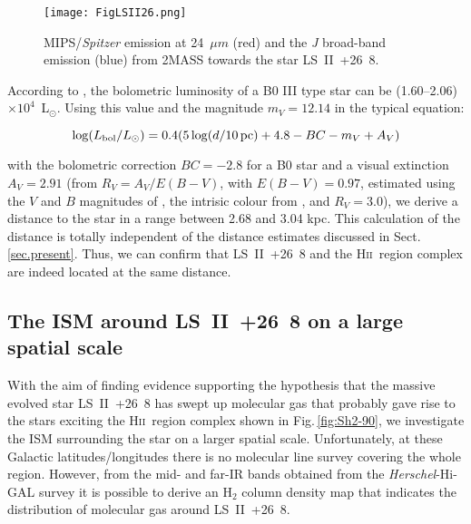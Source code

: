 \documentclass[fleqn,usenatbib]{mnras}
\def\hii{H\textsc{ii}}
\begin{document}
\begin{figure}
    \centering
	\texttt{[image: FigLSII26.png]}
    \caption{MIPS/{\it Spitzer} emission at 24~$\mu m$ (red) and the {\it J} 
broad-band emission (blue) from 2MASS towards the star LS~II~+26~8.}
    \label{fig:LSII26}
\end{figure}

According to \citet{hohle10}, the bolometric luminosity of a B0 III type star can be (1.60--2.06) $\times 10^{4}$~L$_{\odot}$. 
Using this value and the magnitude $m_{V} = 12.14$ \citep{zaca12} in the typical equation:

\begin{equation}
\log(L_{\rm bol}/L_\odot)=0.4(5\log(d/10\,{\rm pc})+4.8 - BC - m_{V} + A_{V}) 
\label{eq.lum}
\end{equation}

\noindent with the bolometric correction $BC = -2.8$ for a B0 star and a visual 
extinction  $A_{V} = 2.91$ (from $R_{V}=A_{V}/E(B-V)$, with $E(B-V)=0.97$,  
estimated using the $V$ and $B$ magnitudes of \citealt{zaca12}, the intrisic colour 
from \citealt{Wegner94}, and $R_{V}=3.0$), we derive a distance to the star in a range 
between 2.68 and 3.04 kpc.  
This calculation of the distance is totally independent of the distance estimates discussed in Sect.\,\ref{sec.present}.
Thus, we can confirm that LS~II~+26~8 and the \hii~region complex are indeed located at the same distance.


\subsection{The ISM around LS~II~+26~8 on a large spatial scale}

With the aim of finding evidence supporting the hypothesis that the massive evolved star
 LS~II~+26~8 has swept up molecular gas that probably gave rise to the stars exciting the
 \hii~region complex shown in Fig.\,\ref{fig:Sh2-90}, we investigate the ISM 
surrounding the star on a larger spatial scale. Unfortunately, at these Galactic 
latitudes/longitudes there is no molecular line survey covering the whole region. 
However, from the mid- and far-IR bands obtained from the {\it Herschel}-Hi-GAL survey
\citep{molinari10} it is possible to derive an H$_{2}$ column density map that 
indicates the distribution of molecular gas around LS~II~+26~8. 
\end{document}
